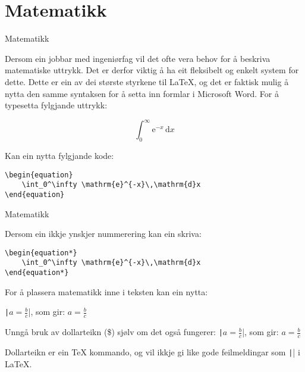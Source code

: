 \section{Matematikk}

	\begin{frame}[containsverbatim]{Matematikk}
	
	Dersom ein jobbar med ingeniørfag vil det ofte vera behov for å beskriva matematiske uttrykk. Det er derfor viktig å ha eit fleksibelt og enkelt system for dette. Dette er ein av dei største styrkene til \LaTeX, og det er faktisk mulig å nytta den samme syntaksen for å setta inn formlar i Microsoft Word. For å typesetta fylgjande uttrykk:
	
	\begin{equation}
		\int_0^\infty \mathrm{e}^{-x}\,\mathrm{d}x
	\end{equation}
	
	Kan ein nytta fylgjande kode:
	
	\begin{verbatim}
\begin{equation}
	\int_0^\infty \mathrm{e}^{-x}\,\mathrm{d}x
\end{equation}
	\end{verbatim}
	
\end{frame}




\begin{frame}[containsverbatim]{Matematikk}
	
	Dersom ein ikkje ynskjer nummerering kan ein skriva:
	
	\begin{verbatim}
\begin{equation*}
	\int_0^\infty \mathrm{e}^{-x}\,\mathrm{d}x
\end{equation*}
	\end{verbatim}
	
	For å plassera matematikk inne i teksten kan ein nytta:
	
	\texttt|\(a = \frac{b}{c}\)|, som gir: \(a = \frac{b}{c}\)
	
	Unngå bruk av dollarteikn (\$) sjølv om det også fungerer:
	\texttt|$a = \frac{b}{c}$|, som gir: $a = \frac{b}{c}$
	
	Dollarteikn er ein \TeX{} kommando, og vil ikkje gi like gode feilmeldingar som \texttt|\(\)| i \LaTeX{}.
	
	
	
\end{frame}



